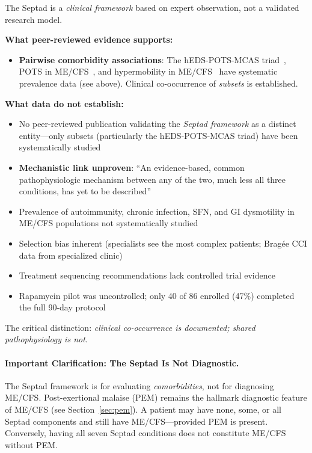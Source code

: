 \begin{limitation}
The Septad is a \emph{clinical framework} based on expert observation, not a validated research model.

\textbf{What peer-reviewed evidence supports:}
\begin{itemize}
    \item \textbf{Pairwise comorbidity associations}: The hEDS-POTS-MCAS triad~\cite{Wang2021triad}, POTS in ME/CFS~\cite{Hoad2008pots}, and hypermobility in ME/CFS~\cite{Hakim2017fatigue} have systematic prevalence data (see above). Clinical co-occurrence of \emph{subsets} is established.
\end{itemize}

\textbf{What data do not establish:}
\begin{itemize}
    \item No peer-reviewed publication validating the \emph{Septad framework} as a distinct entity---only subsets (particularly the hEDS-POTS-MCAS triad) have been systematically studied
    \item \textbf{Mechanistic link unproven}: ``An evidence-based, common pathophysiologic mechanism between any of the two, much less all three conditions, has yet to be described''~\cite{Kucharik2020}
    \item Prevalence of autoimmunity, chronic infection, SFN, and GI dysmotility in ME/CFS populations not systematically studied
    \item Selection bias inherent (specialists see the most complex patients; Bragée CCI data from specialized clinic)
    \item Treatment sequencing recommendations lack controlled trial evidence
    \item Rapamycin pilot was uncontrolled; only 40 of 86 enrolled (47\%) completed the full 90-day protocol
\end{itemize}

The critical distinction: \emph{clinical co-occurrence is documented; shared pathophysiology is not}.
\end{limitation}

\paragraph{Important Clarification: The Septad Is Not Diagnostic.}
The Septad framework is for evaluating \emph{comorbidities}, not for diagnosing ME/CFS. Post-exertional malaise (PEM) remains the hallmark diagnostic feature of ME/CFS (see Section~\ref{sec:pem}). A patient may have none, some, or all Septad components and still have ME/CFS---provided PEM is present. Conversely, having all seven Septad conditions does not constitute ME/CFS without PEM.


